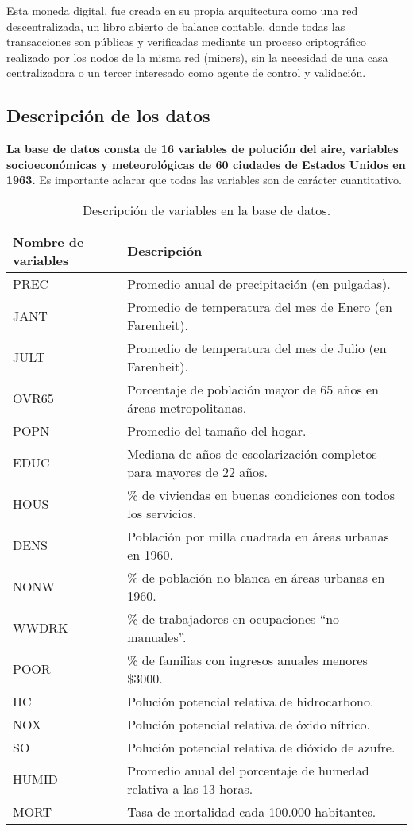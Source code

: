 \documentclass[a4paper,12pt,twocolumn]{article}
\begin{document}
Esta moneda digital, fue creada en su propia arquitectura como una red descentralizada, un libro abierto de balance contable, donde todas las transacciones son públicas y verificadas mediante un proceso criptográfico realizado por los nodos de la misma red (miners), sin la necesidad de una casa centralizadora o un tercer interesado como agente de control y validación\cite{Satoshi}. 




\subsection{Descripción de los datos}
\textbf{La base de datos consta de 16 variables de polución del aire, variables socioeconómicas y meteorológicas
de 60 ciudades de Estados Unidos en 1963.}
\linebreak
Es importante aclarar que todas las variables son de carácter cuantitativo.
\begin{table*}[!hbt]
\centering
\caption{Descripción de variables en la base de datos.}
\label{tab-variables_bd}
\begin{tabular}{|l|l|}
\hline Nombre de variables & Descripción\\
\hline PREC & Promedio anual de precipitación (en pulgadas).\\
\hline JANT & Promedio de temperatura del mes de Enero (en Farenheit).\\
\hline JULT & Promedio de temperatura del mes de Julio (en Farenheit).\\
\hline OVR65 & Porcentaje de población mayor de 65 años en áreas metropolitanas.\\
\hline POPN & Promedio del tamaño del hogar.\\
\hline EDUC & Mediana de años de escolarización completos para mayores de 22 años.\\
\hline HOUS & \% de viviendas en buenas condiciones con todos los servicios.\\
\hline DENS & Población por milla cuadrada en áreas urbanas en 1960.\\
\hline NONW & \% de población no blanca en áreas urbanas en 1960.\\
\hline WWDRK & \% de trabajadores en ocupaciones “no manuales”.\\
\hline POOR & \% de familias con ingresos anuales menores \$3000.\\
\hline HC & Polución potencial relativa de hidrocarbono.\\
\hline NOX & Polución potencial relativa de óxido nítrico.\\
\hline SO & Polución potencial relativa de dióxido de azufre.\\
\hline HUMID & Promedio anual del porcentaje de humedad relativa a las 13 horas.\\
\hline MORT & Tasa de mortalidad cada 100.000 habitantes.\\
\hline
\end{tabular}
\end{table*}
%
\end{document}
